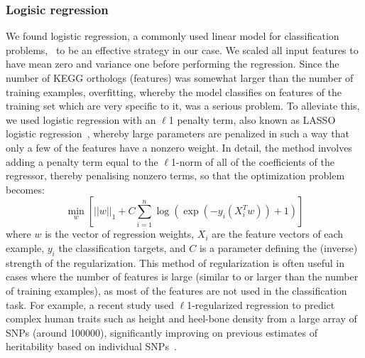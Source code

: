 \documentclass[10pt,letterpaper]{article}
\begin{document}
\subsubsection*{Logisic regression}
We found logistic regression, a commonly used linear model for classification problems,~\cite{Hastie2009a,Freedman2009} to be an effective strategy in our case. We scaled all input features to have mean zero and variance one before performing the regression. Since the number of KEGG orthologs (features) was somewhat larger than the number of training examples, overfitting, whereby the model classifies on features of the training set which are very specific to it, was a serious problem. To alleviate this, we used logistic regression with an $\ell$1 penalty term, also known as LASSO logistic regression~\cite{Lee2006}, whereby large parameters are penalized in such a way that only a few of the features have a nonzero weight. In detail, the method involves adding a penalty term equal to the $\ell$1-norm of all of the coefficients of the regressor, thereby penalising nonzero terms, so that the optimization problem becomes:
\begin{equation}
\min_{w}\left[||w||_1 + C\sum_{i=1}^{n}\log\left(\exp(-y_i(X_i^T w )) + 1\right)\right]
\end{equation}
where $w$ is the vector of regression weights, $X_i$ are the feature vectors of each example, $y_i$ the classification targets, and $C$ is a parameter defining the (inverse) strength of the regularization. This method of regularization is often useful in cases where the number of features is large (similar to or larger than the number of training examples), as most of the features are not used in the classification task. For example, a recent study used $\ell$1-regularized regression to predict complex human traits such as height and heel-bone density from a large array of SNPs (around 100000), significantly improving on previous estimates of heritability based on individual SNPs~\cite{Lello2017}. 

\end{document}
